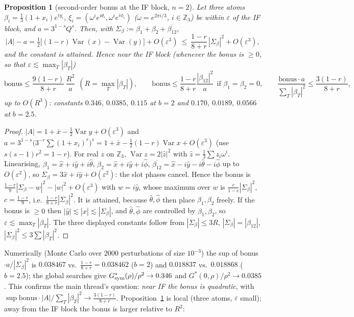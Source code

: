 \documentclass[11pt]{article}
\newtheorem{proposition}[theorem]{Proposition}
\theoremstyle{definition}
\begin{document}
\begin{proposition}[second-order bonus at the IF block, $n=2$]\label{prop:local}
Let three atoms $\beta_i=\frac13(1+x_i)e^{iy_i}$, $\xi_i=(\omega^ie^{i\theta_i},\omega^ie^{i\phi_i})$ ($\omega=e^{2\pi i/3}$, $i\in\mathbb Z_3$) be within $\varepsilon$
of the IF block, and $a=3^{1-s}Q^s$.  Then, with $\Sigma_\beta:=\beta_1+\beta_2+\overline{\beta_{12}}$,
\[|A|-a=\tfrac12\big[(1-r)\operatorname{Var}(x)-\operatorname{Var}(y)\big]+O(\varepsilon^3)\ \le\ \frac{1-r}{8+r}\,|\Sigma_\beta|^2+O(\varepsilon^3),\]
and the constant is attained.  Hence near the IF block (whenever the bonus is $\ge0$, so that $\varepsilon\lesssim\max_T|\beta_T|$)
\[\text{bonus}\le\frac{9(1-r)}{8+r}\,\frac{R^2}a\ \ (R=\max_T|\beta_T|),\qquad\text{bonus}\le\frac{1-r}{8+r}\frac{|\beta_{12}|^2}a\ \ \text{if }\beta_1=\beta_2=0,\qquad
\frac{\text{bonus}\cdot a}{\sum_T|\beta_T|^2}\le\frac{3(1-r)}{8+r},\]
up to $O(R^3)$: constants $0.346,\ 0.0385,\ 0.115$ at $b=2$ and $0.170,\ 0.0189,\ 0.0566$ at $b=2.5$.
\end{proposition}
\begin{proof}
$|A|=1+\bar x-\frac12\operatorname{Var}y+O(\varepsilon^3)$ and $a=3^{1-s}\big(3^{-r}\sum(1+x_i)^r\big)^s=1+\bar x-\frac12(1-r)\operatorname{Var}x+O(\varepsilon^3)$ (use
$s(s-1)r^2=1-r$).  For real $z$ on $\mathbb Z_3$, $\operatorname{Var}z=2|\hat z|^2$ with $\hat z=\frac13\sum z_i\omega^i$.  Linearising,
$\beta_1=\hat x+i\hat y+i\hat\theta$, $\beta_2=\hat x+i\hat y+i\hat\phi$, $\overline{\beta_{12}}=\hat x-i\hat y-i\hat\theta-i\hat\phi$ up to $O(\varepsilon^2)$, so
$\Sigma_\beta=3\hat x+i\hat y+O(\varepsilon^2)$: the slot phases cancel.  Hence the bonus is $\frac{1-r}9|\Sigma_\beta-w|^2-|w|^2+O(\varepsilon^3)$ with $w=i\hat y$, whose
maximum over $w$ is $\frac{c}{1-c}|\Sigma_\beta|^2$, $c=\frac{1-r}9$, i.e.\ $\frac{1-r}{8+r}|\Sigma_\beta|^2$.  It is attained, because $\hat\theta,\hat\phi$ then place
$\beta_1,\beta_2$ freely.  If the bonus is $\ge0$ then $|\hat y|\lesssim|\hat x|\lesssim|\Sigma_\beta|$, and $\hat\theta,\hat\phi$ are controlled by $\beta_1,\beta_2$, so
$\varepsilon\lesssim\max_T|\beta_T|$.  The three displayed constants follow from $|\Sigma_\beta|\le3R$, $|\Sigma_\beta|=|\beta_{12}|$, $|\Sigma_\beta|^2\le3\sum|\beta_T|^2$.
\end{proof}
Numerically (Monte Carlo over $2000$ perturbations of size $10^{-3}$) the sup of bonus$\cdot a/|\Sigma_\beta|^2$ is $0.038467$ vs.\ $\frac{1-r}{8+r}=0.038462$
($b=2$) and $0.018837$ vs.\ $0.018868$ ($b=2.5$); the global searches give $G^*_{\rm sym}(\rho)/\rho^2\to0.346$ and $G^*(0,\rho)/\rho^2\to0.0385$.
This confirms the main thread's question: \emph{near IF the bonus is quadratic}, with $\sup\text{bonus}\cdot|A|/\sum_T|\beta_T|^2\to\frac{3(1-r)}{8+r}$.
Proposition~\ref{prop:local} is local (three atoms, $\varepsilon$ small); away from the IF block the bonus is larger relative to $R^2$:
\end{document}
